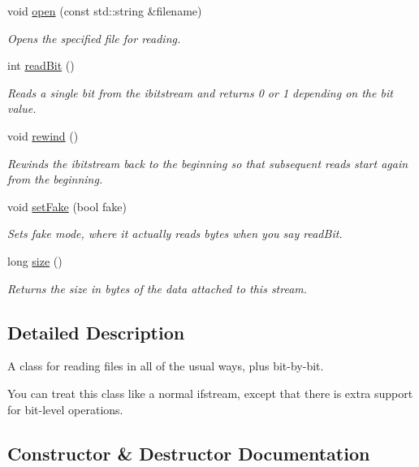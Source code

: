 \begin{DoxyCompactItemize}
void \mbox{\hyperlink{classifbitstream_a72f6f3d1b9bc5a4275359cc0a83a60bd}{open}} (const std\+::string \&filename)
\begin{DoxyCompactList}\small\item\em Opens the specified file for reading. \end{DoxyCompactList}\item 
int \mbox{\hyperlink{classibitstream_aa8c615fa7957fb0232a0873dadbd39e8}{read\+Bit}} ()
\begin{DoxyCompactList}\small\item\em Reads a single bit from the ibitstream and returns 0 or 1 depending on the bit value. \end{DoxyCompactList}\item 
void \mbox{\hyperlink{classibitstream_ab8734e666421c9fe3b6380a818c6c727}{rewind}} ()
\begin{DoxyCompactList}\small\item\em Rewinds the ibitstream back to the beginning so that subsequent reads start again from the beginning. \end{DoxyCompactList}\item 
void \mbox{\hyperlink{classibitstream_ad916b4624eb09d375514964f867b475c}{set\+Fake}} (bool fake)
\begin{DoxyCompactList}\small\item\em Sets \textquotesingle{}fake\textquotesingle{} mode, where it actually reads bytes when you say read\+Bit. \end{DoxyCompactList}\item 
long \mbox{\hyperlink{classibitstream_a22727e9c338fb1aaa6722031445373c3}{size}} ()
\begin{DoxyCompactList}\small\item\em Returns the size in bytes of the data attached to this stream. \end{DoxyCompactList}\end{DoxyCompactItemize}


\subsection{Detailed Description}
A class for reading files in all of the usual ways, plus bit-\/by-\/bit. 

You can treat this class like a normal ifstream, except that there is extra support for bit-\/level operations. 

\subsection{Constructor \& Destructor Documentation}
\mbox{\label{classifbitstream_a2d6148d42c4e6bcac770d185b25a691e}} 
